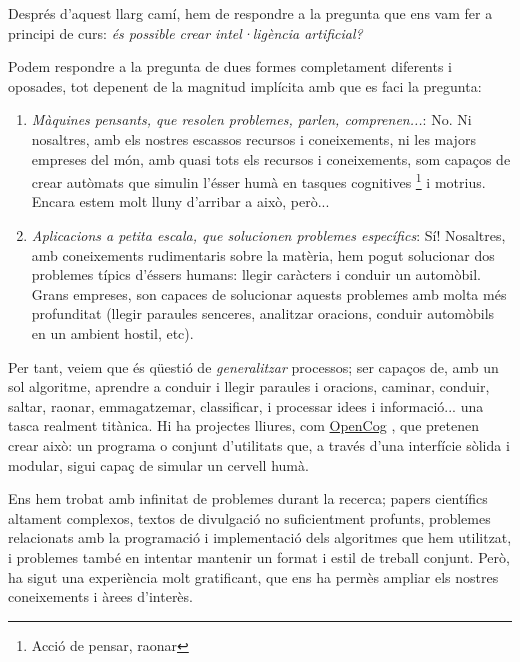 Després d'aquest llarg camí, hem de respondre a la pregunta que ens vam fer a principi de curs:
\emph{és possible crear intel·ligència artificial?}

Podem respondre a la pregunta de dues formes completament diferents i oposades, tot depenent
de la magnitud implícita amb que es faci la pregunta:
\begin{enumerate}
\item \emph{Màquines pensants, que resolen problemes, parlen, comprenen...}: No. Ni nosaltres,
amb els nostres escassos recursos i coneixements, ni les majors empreses del món, amb quasi tots
els recursos i coneixements, som capaços de crear autòmats que simulin l'ésser humà en tasques
cognitives \footnote{Acció de pensar, raonar} i motrius. Encara estem molt lluny d'arribar a això, però...
\item \emph{Aplicacions a petita escala, que solucionen problemes específics}: Sí! Nosaltres,
amb coneixements rudimentaris sobre la matèria, hem pogut solucionar dos problemes típics d'éssers humans:
llegir caràcters i conduir un automòbil. Grans empreses, son capaces de solucionar aquests problemes amb
molta més profunditat (llegir paraules senceres, analitzar oracions, conduir automòbils en un ambient hostil, etc).
\end{enumerate}

Per tant, veiem que és qüestió de \emph{generalitzar} processos; ser capaços de, amb un sol algoritme,
aprendre a conduir i llegir paraules i oracions, caminar, conduir, saltar, raonar, emmagatzemar, classificar,
i processar idees i informació... una tasca realment titànica. Hi ha projectes lliures, com \href{http://opencog.org/}{OpenCog}
, que
pretenen crear això: un programa o conjunt d'utilitats que, a través d'una interfície sòlida i modular, sigui
capaç de simular un cervell humà.

Ens hem trobat amb infinitat de problemes durant la recerca; papers científics altament complexos,
textos de divulgació no suficientment profunts, problemes relacionats amb la programació i implementació
dels algoritmes que hem utilitzat, i problemes també en intentar mantenir un format i estil de treball
conjunt. Però, ha sigut una experiència molt gratificant, que ens ha permès ampliar els nostres coneixements
i àrees d'interès.
